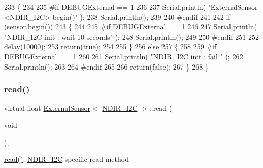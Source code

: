 \begin{DoxyCode}
233     \{
234     
235 \textcolor{preprocessor}{    #if DEBUGExternal == 1 }
236 
237         Serial.println( \textcolor{stringliteral}{"ExternalSensor <NDIR\_I2C> begin()"} );
238         Serial.println();
239     
240 \textcolor{preprocessor}{    #endif }
241 
242         \textcolor{keywordflow}{if} (\hyperlink{class_external_sensor_3_01_n_d_i_r___i2_c_01_4_ae541c9cece7c38674b70114cdb74a7dc}{sensor}.\hyperlink{class_n_d_i_r___i2_c_acf82f3dcb41e75709a93f8b68d087a3c}{begin}()) 
243         \{
244         
245 \textcolor{preprocessor}{        #if DEBUGExternal == 1 }
246             
247             Serial.println( \textcolor{stringliteral}{"NDIR\_I2C init : wait 10 seconds"} );
248             Serial.println();
249         
250 \textcolor{preprocessor}{        #endif}
251 
252             delay(10000);
253             \textcolor{keywordflow}{return}(\textcolor{keyword}{true});
254 
255             \}
256         \textcolor{keywordflow}{else} 
257         \{
258         
259 \textcolor{preprocessor}{        #if DEBUGExternal == 1 }
260 
261             Serial.println( \textcolor{stringliteral}{"NDIR\_I2C init : fail "} );
262             Serial.println();
263         
264 \textcolor{preprocessor}{        #endif}
265 
266             \textcolor{keywordflow}{return}(\textcolor{keyword}{false});
267         \}   
268     \}
\end{DoxyCode}
\mbox{\label{class_external_sensor_3_01_n_d_i_r___i2_c_01_4_a239d18652e9fb4673842ae9726edf44f}} 
\subsubsection{\texorpdfstring{read()}{read()}}
{\footnotesize\ttfamily virtual float \hyperlink{class_external_sensor}{External\+Sensor}$<$ \hyperlink{class_n_d_i_r___i2_c}{N\+D\+I\+R\+\_\+\+I2C} $>$\+::read (\begin{DoxyParamCaption}\item[{void}]{ }\end{DoxyParamCaption})\hspace{0.3cm}{\ttfamily [inline]}, {\ttfamily [virtual]}}

\hyperlink{class_external_sensor_3_01_n_d_i_r___i2_c_01_4_a239d18652e9fb4673842ae9726edf44f}{read()}\+: \hyperlink{class_n_d_i_r___i2_c}{N\+D\+I\+R\+\_\+\+I2C} specific read method


